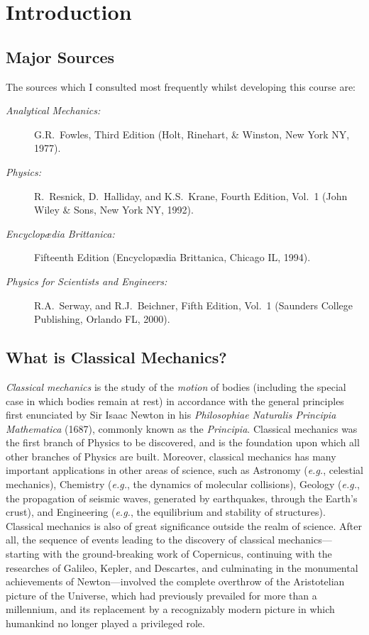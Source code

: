 \section{Introduction}\label{s1}

\subsection{Major Sources}
The sources which I  consulted most frequently whilst developing this 
course  are:
\begin{description}
\item [\em Analytical Mechanics:] G.R.~Fowles, Third Edition (Holt, Rinehart, \& Winston,
New York NY, 1977).
\item [\em Physics:] R.~Resnick, D.~Halliday, and K.S.~Krane, Fourth Edition, Vol.~1
(John Wiley \& Sons, New York NY, 1992).
\item [\em Encyclop\ae dia Brittanica:] Fifteenth Edition (Encyclop\ae dia Brittanica, Chicago IL,
1994).
\item [\em Physics for Scientists and Engineers:] R.A.~Serway, and
R.J.~Beichner, Fifth Edition, Vol.~1 (Saunders College Publishing, Orlando FL, 2000).
\end{description}

\subsection{What is Classical Mechanics?}
{\em Classical mechanics} is the study of the {\em motion} of bodies (including the
special case in which bodies remain at rest) in accordance with the general
principles first enunciated by Sir Isaac Newton in his {\em Philosophiae
Naturalis Principia Mathematica} (1687), commonly known as the {\em Principia}. 
Classical mechanics was the first branch of Physics to be discovered, and is
the foundation upon which all other branches of Physics are built. 
Moreover, classical mechanics 
has many important applications in other areas of science,
such as Astronomy ({\em e.g.}, celestial mechanics), Chemistry
({\em e.g.}, the dynamics of molecular collisions), Geology ({\em e.g.}, the propagation
of seismic  waves, generated by earthquakes, through the Earth's crust), and Engineering
({\em e.g.}, the equilibrium and stability of structures). Classical
mechanics is also of great  significance outside the realm of science. After all, the sequence of
events leading  to the discovery of classical mechanics---starting with the ground-breaking
work of Copernicus, continuing with the researches of Galileo, Kepler, and Descartes,
and culminating in the monumental achievements of Newton---involved the complete overthrow
of the Aristotelian picture of the Universe, which had previously prevailed for more than a
millennium, and its replacement by a recognizably modern picture in which humankind
no longer played a privileged role.

